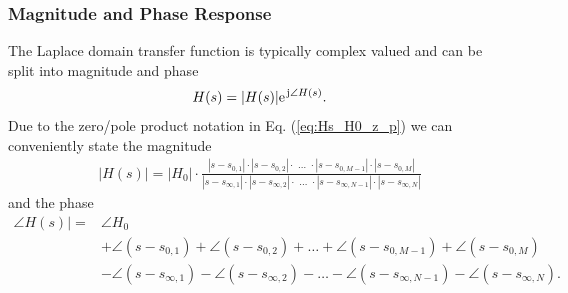 \documentclass[11pt,a4paper,DIV=12]{scrartcl}
\numberwithin{equation}{section}
\numberwithin{figure}{section}
\newcommand{\eq}[1]{Eq. (\ref{#1})} %
\begin{document}
\subsubsection{Magnitude and Phase Response}
The Laplace domain transfer function is typically complex valued and can be
split into magnitude and phase
\begin{align}
H(s) = |H(s)| \e^{\im \angle H(s)}.
\end{align}
%
Due to the zero/pole product notation in \eq{eq:Hs_H0_z_p}
we can conveniently state the magnitude
\begin{align}
\label{eq:Hs_H0_z_p_mag}
|H(s)| = |H_0| \cdot \frac
{|s-s_{0,1}| \cdot |s-s_{0,2}| \cdot  \,\,\dots \,\,\cdot  |s-s_{0,M-1}| \cdot  |s-s_{0,M}|}
{|s-s_{\infty,1}| \cdot  |s-s_{\infty,2}| \cdot  \,\,\dots\,\, \cdot |s-s_{\infty,N-1}| \cdot |s-s_{\infty,N}|}
\end{align}
and the phase
\begin{align}
\label{eq:Hs_H0_z_p_phase}
\angle H(s)| =& \angle H_0\\
&
+\angle (s-s_{0,1})
+\angle (s-s_{0,2})
+\dots
+\angle (s-s_{0,M-1})
+\angle (s-s_{0,M})\\
&
-\angle (s-s_{\infty,1})
-\angle (s-s_{\infty,2})
-\dots
-\angle (s-s_{\infty,N-1})
-\angle (s-s_{\infty,N}).
\end{align}
\end{document}
